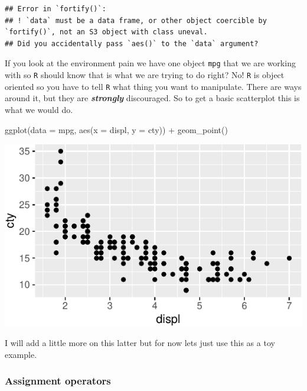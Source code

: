 \documentclass[]{tufte-handout}
\newenvironment{Shaded}{}{}
\newcommand{\AttributeTok}[1]{\textcolor[rgb]{0.49,0.56,0.16}{#1}}
\newcommand{\FunctionTok}[1]{\textcolor[rgb]{0.02,0.16,0.49}{#1}}
\newcommand{\NormalTok}[1]{#1}
\newcommand{\SpecialCharTok}[1]{\textcolor[rgb]{0.25,0.44,0.63}{#1}}
\begin{document}
\begin{verbatim}
## Error in `fortify()`:
## ! `data` must be a data frame, or other object coercible by `fortify()`, not an S3 object with class uneval.
## Did you accidentally pass `aes()` to the `data` argument?
\end{verbatim}

If you look at the environment pain we have one object \texttt{mpg} that
we are working with so \texttt{R} should know that is what we are trying
to do right? No! \texttt{R} is object oriented so you have to tell
\texttt{R} what thing you want to manipulate. There are ways around it,
but they are \textbf{\emph{strongly}} discouraged. So to get a basic
scatterplot this is what we would do.

\begin{Shaded}
\begin{Highlighting}[]
\FunctionTok{ggplot}\NormalTok{(}\AttributeTok{data =}\NormalTok{ mpg, }\FunctionTok{aes}\NormalTok{(}\AttributeTok{x =}\NormalTok{ displ, }\AttributeTok{y =}\NormalTok{ cty)) }\SpecialCharTok{+}
  \FunctionTok{geom\_point}\NormalTok{()}
\end{Highlighting}
\end{Shaded}

\begin{center}\includegraphics{R-Guide_files/figure-latex/error-fix-example-1} \end{center}

I will add a little more on this latter but for now lets just use this
as a toy example.

\hypertarget{assignment-operators}{%
\subsubsection{Assignment operators}\label{assignment-operators}}
\end{document}

